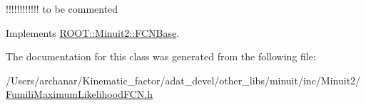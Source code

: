 !!!!!!!!!!!! to be commented 

Implements \mbox{\hyperlink{classROOT_1_1Minuit2_1_1FCNBase_a04ef08ddad92ce8d89d498efbe021c39}{R\+O\+O\+T\+::\+Minuit2\+::\+F\+C\+N\+Base}}.



The documentation for this class was generated from the following file\+:\begin{DoxyCompactItemize}
\item 
/\+Users/archanar/\+Kinematic\+\_\+factor/adat\+\_\+devel/other\+\_\+libs/minuit/inc/\+Minuit2/\mbox{\hyperlink{other__libs_2minuit_2inc_2Minuit2_2FumiliMaximumLikelihoodFCN_8h}{Fumili\+Maximum\+Likelihood\+F\+C\+N.\+h}}\end{DoxyCompactItemize}
